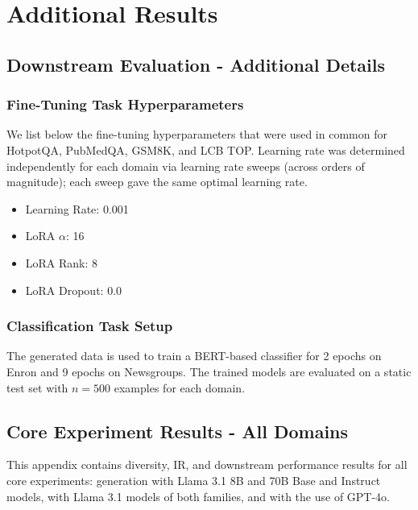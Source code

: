 \section{Additional Results}
\label{appendix_experiments}

\subsection{Downstream Evaluation - Additional Details}

\subsubsection{Fine-Tuning Task Hyperparameters}
\label{appendix_hyperparameters}

We list below the fine-tuning hyperparameters that were used in common for HotpotQA, PubMedQA, GSM8K, and LCB TOP. Learning rate was determined independently for each domain via learning rate sweeps (across orders of magnitude); each sweep gave the same optimal learning rate.

\begin{itemize}
    \setlength\itemsep{-0.5em}
    \item Learning Rate: 0.001
    \item LoRA $\alpha$: 16
    \item LoRA Rank: 8
    \item LoRA Dropout: 0.0
\end{itemize}

\subsubsection{Classification Task Setup}
\label{appendix_class_train}

The generated data is used to train a BERT-based classifier \cite{bert} for 2 epochs on Enron and 9 epochs on Newsgroups. The trained models are evaluated on a static test set with $n=500$ examples for each domain.

\subsection{Core Experiment Results - All Domains}
\label{appendix_core}

This appendix contains diversity, IR, and downstream performance results for all core experiments: generation with Llama 3.1 8B and 70B Base and Instruct models, \Sys{} with Llama 3.1 models of both families, and \Sys{} with the use of GPT-4o.

